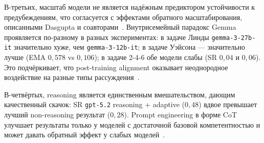 В-третьих, масштаб модели не является надёжным предиктором устойчивости к предубеждениям, что согласуется с эффектами обратного масштабирования, описанными Dasgupta и соавторами~\cite{dasgupta2024language}. Внутрисемейный парадокс Gemma проявляется по-разному в разных экспериментах: в задаче Линды \texttt{gemma-3-27b-it} значительно хуже, чем \texttt{gemma-3-12b-it}; в задаче Уэйсона --- значительно лучше (EMA $0{,}578$ vs $0{,}106$); в задаче 2-4-6 обе модели слабы (SR $0{,}04$ и $0{,}06$). Это подчёркивает, что post-training alignment оказывает неоднородное воздействие на разные типы рассуждения~\cite{batista2026rational}.

В-четвёртых, reasoning является единственным вмешательством, дающим качественный скачок: SR \texttt{gpt-5.2} reasoning + adaptive ($0{,}48$) вдвое превышает лучший non-reasoning результат ($0{,}28$). Prompt engineering в форме CoT улучшает результаты только у моделей с достаточной базовой компетентностью и может давать обратный эффект у слабых моделей~\cite{kojima2022large}.
